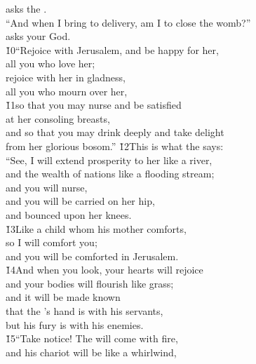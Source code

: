 \begin{poetry}
\poemll    asks the . \\
\poeml ``And when I bring to delivery, am I to close the womb?'' \\
\poemll    asks your God. \\
\poeml \v{10}``Rejoice with Jerusalem, and be happy for her, \\
\poemll    all you who love her; \\
\poeml rejoice with her in gladness, \\
\poemll    all you who mourn over her, \\
\poeml \v{11}so that you may nurse and be satisfied \\
\poemll    at her consoling breasts, \\
\poeml and so that you may drink deeply and take delight \\
\poemll    from her glorious bosom.''
\poeml \v{12}This is what the  says: \\
\poeml ``See, I will extend prosperity to her like a river, \\
\poemll    and the wealth of nations like a flooding stream; \\
\poeml and you will nurse, \\
\poemll    and you will be carried on her hip, \\
\poemlll       and bounced upon her knees. \\
\poeml \v{13}Like a child whom his mother comforts, \\
\poemll    so I will comfort you; \\
\poemlll       and you will be comforted in Jerusalem. \\
\poeml \v{14}And when you look, your hearts will rejoice \\
\poemll    and your bodies will flourish like grass; \\
\poeml and it will be made known \\
\poemll    that the 's hand is with his servants, \\
\poemlll       but his fury is with his enemies. \\
\poeml \v{15}``Take notice! The  will come with fire, \\
\poemll    and his chariot will be like a whirlwind, \\

\end{poetry}
